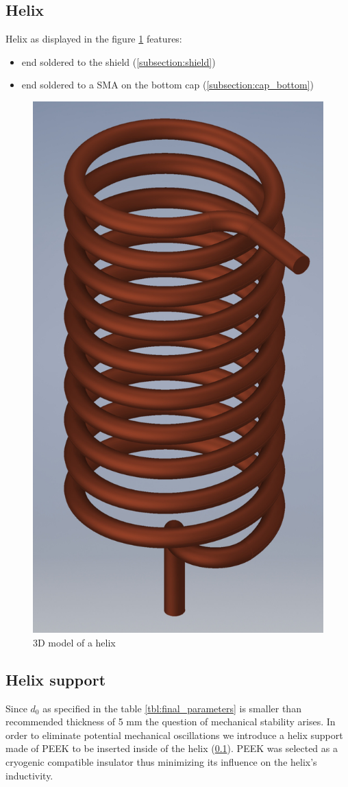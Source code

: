 \clearpage
\subsection{Helix}
\label{subsection:helix}
Helix as displayed in the figure \ref{fig:helix} features:
\begin{itemize}
	\item end soldered to the shield (\ref{subsection:shield})
	\item end soldered to a SMA on the bottom cap (\ref{subsection:cap_bottom})
\end{itemize}

\begin{figure}[h]
	\centering
	\includegraphics[width=.71\textwidth]{images/coil_small}
	\caption{3D model of a helix}
	\label{fig:helix}
\end{figure}

\clearpage
\subsection{Helix support}
\label{subsection:helix_support}
Since $d_0$ as specified in the table \ref{tbl:final_parameters} is smaller than recommended thickness of 5 mm the question of mechanical stability arises. In order to eliminate potential mechanical oscillations we introduce a helix support made of PEEK to be inserted inside of the helix (\ref{subsection:helix}). PEEK was selected as a cryogenic compatible insulator thus minimizing its influence on the helix's inductivity.


